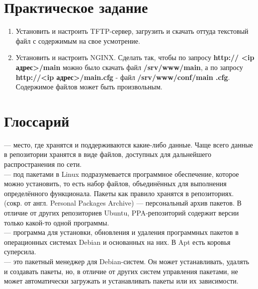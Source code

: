\documentclass[14pt, a4paper]{article}
\begin{document}
\section*{Практическое задание} 

\begin{enumerate}
    \item Установить и настроить TFTP-сервер, загрузить и скачать оттуда текстовый файл с
    содержимым на свое усмотрение.
    \item Установить и настроить NGINX. Сделать так, чтобы по запросу \textbf{http:// <ip адрес>/main} можно
    было скачать файл \textbf{/srv/www/main}, а по запросу \textbf{http://<ip адрес>/main.cfg} - файл
    \textbf{/srv/www/conf/main .cfg}. Содержимое файлов может быть произвольным.
\end{enumerate}

\newpage

\section*{Глоссарий} 

\href{https://ru.wikipedia.org/wiki/Репозиторий}{} — место, где хранятся и поддерживаются какие-либо данные. Чаще всего данные в
репозитории хранятся в виде файлов, доступных для дальнейшего распространения по сети.\\

\noindent {} — под пакетами в Linux подразумевается программное обеспечение, которое можно
установить, то есть набор файлов, объединённых для выполнения определённого функционала.
Пакеты как правило хранятся в репозиториях.\\

\noindent \href{https://help.ubuntu.ru/wiki/ppa}{} (сокр. от англ. Personal Packages Archive) — персональный архив пакетов. В отличие от других
репозиториев Ubuntu, PPA-репозиторий содержит версии только какой-то одной программы.\\

\noindent \href{https://ru.wikipedia.org/wiki/Advanced_Packaging_Tool}{} — программа для установки, обновления и удаления программных пакетов в операционных
системах Debian и основанных на них. В Apt есть коровья суперсила.\\

\noindent \href{https://help.ubuntu.ru/wiki/руководство_по_ubuntu_server/управление_пакетами/dpkg}{} — это пакетный менеджер для Debian-систем. Он может устанавливать, удалять и создавать
пакеты, но, в отличие от других систем управления пакетами, не может автоматически загружать и
устанавливать пакеты или их зависимости.\\
\end{document}
